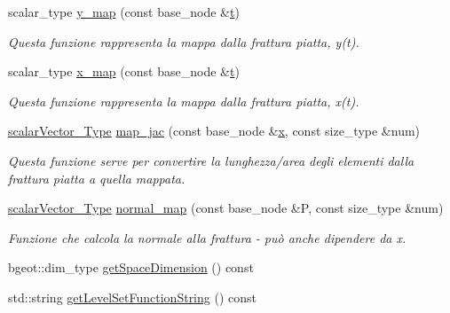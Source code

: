 \begin{DoxyCompactItemize}
scalar\-\_\-type \hyperlink{classLevelSetData_aa4cda1cced4bc385d85383b40bbc2631}{y\-\_\-map} (const base\-\_\-node \&\hyperlink{discontinuo_8m_aaccc9105df5383111407fd5b41255e23}{t})
\begin{DoxyCompactList}\small\item\em Questa funzione rappresenta la mappa dalla frattura piatta, y(t). \end{DoxyCompactList}\item 
scalar\-\_\-type \hyperlink{classLevelSetData_ae7f10d3f10b72fbb6f703ba7aa8fe17b}{x\-\_\-map} (const base\-\_\-node \&\hyperlink{discontinuo_8m_aaccc9105df5383111407fd5b41255e23}{t})
\begin{DoxyCompactList}\small\item\em Questa funzione rappresenta la mappa dalla frattura piatta, x(t). \end{DoxyCompactList}\item 
\hyperlink{Core_8h_a4e75b5863535ba1dd79942de2846eff0}{scalar\-Vector\-\_\-\-Type} \hyperlink{classLevelSetData_a40fcfa36de7ac76613284d03690eb54b}{map\-\_\-jac} (const base\-\_\-node \&\hyperlink{risultati__bastian_8m_a9336ebf25087d91c818ee6e9ec29f8c1}{x}, const size\-\_\-type \&num)
\begin{DoxyCompactList}\small\item\em Questa funzione serve per convertire la lunghezza/area degli elementi dalla frattura piatta a quella mappata. \end{DoxyCompactList}\item 
\hyperlink{Core_8h_a4e75b5863535ba1dd79942de2846eff0}{scalar\-Vector\-\_\-\-Type} \hyperlink{classLevelSetData_a674d56690f4e22cbca38bf4b5f176a5e}{normal\-\_\-map} (const base\-\_\-node \&P, const size\-\_\-type \&num)
\begin{DoxyCompactList}\small\item\em Funzione che calcola la normale alla frattura -\/ può anche dipendere da x. \end{DoxyCompactList}\item 
bgeot\-::dim\-\_\-type \hyperlink{classLevelSetData_aa4c3e1f7876cd318e80f5052689fe9e3}{get\-Space\-Dimension} () const 
\item 
std\-::string \hyperlink{classLevelSetData_a672418971ce9b1bf71d3c6bccd278bd7}{get\-Level\-Set\-Function\-String} () const 
\end{DoxyCompactItemize}


